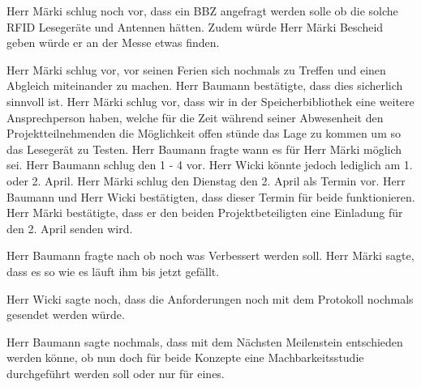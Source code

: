 \documentclass[parskip=full, a4paper]{scrreprt}
\begin{document}
Herr Märki schlug noch vor, dass ein BBZ angefragt werden solle ob die solche RFID Lesegeräte und Antennen hätten. 
Zudem würde Herr Märki Bescheid geben würde er an der Messe etwas finden.

Herr Märki schlug vor, vor seinen Ferien sich nochmals zu Treffen und einen Abgleich miteinander zu machen.
Herr Baumann bestätigte, dass dies sicherlich sinnvoll ist.
Herr Märki schlug vor, dass wir in der Speicherbibliothek eine weitere Ansprechperson haben, welche für die Zeit während seiner Abwesenheit den Projektteilnehmenden die Möglichkeit offen stünde das Lage zu kommen um so das Lesegerät zu Testen.
Herr Baumann fragte wann es für Herr Märki möglich sei.
Herr Baumann schlug den 1 - 4 vor. Herr Wicki könnte jedoch lediglich am 1. oder 2. April.
Herr Märki schlug den Dienstag den 2. April als Termin vor. 
Herr Baumann und Herr Wicki bestätigten, dass dieser Termin für beide funktionieren.
Herr Märki bestätigte, dass er den beiden Projektbeteiligten eine Einladung für den 2. April senden wird.

Herr Baumann fragte nach ob noch was Verbessert werden soll. Herr Märki sagte, dass es so wie es läuft ihm bis jetzt gefällt.

Herr Wicki sagte noch, dass die Anforderungen noch mit dem Protokoll nochmals gesendet werden würde.

Herr Baumann sagte nochmals, dass mit dem Nächsten Meilenstein entschieden werden könne, ob nun doch für beide Konzepte eine Machbarkeitsstudie durchgeführt werden soll oder nur für eines.
\end{document}
